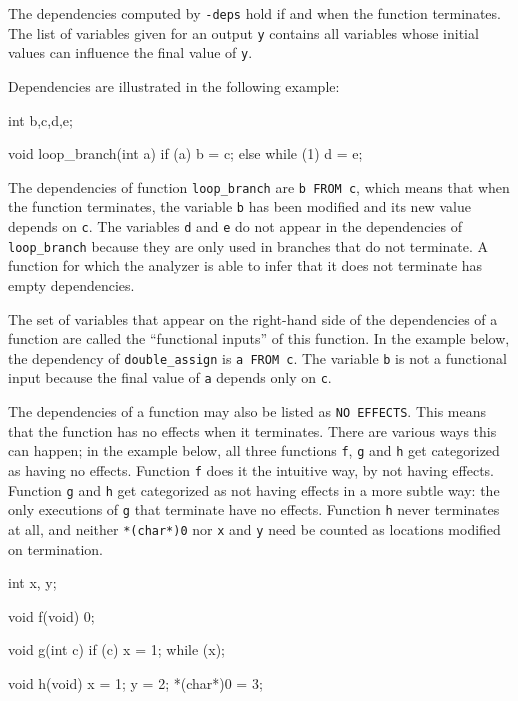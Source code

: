 \documentclass[web]{frama-c-book}
\begin{document}
The dependencies computed by \lstinline|-deps| hold if and when the function
terminates. The list of variables given for an output \lstinline|y|
contains all variables whose initial values can influence the final value
of \lstinline|y|.

Dependencies are illustrated in the following example:

\begin{listing}{1}
int b,c,d,e;

void loop_branch(int a)
{
  if (a)
    b = c;
  else
    while (1) d = e;
}
\end{listing}

The dependencies of function \lstinline|loop_branch| are
\lstinline|b FROM c|, which means that when the
function terminates, the variable \lstinline|b| has been modified
and its new value depends on \lstinline|c|. The variables \lstinline|d| and \lstinline|e|
do not appear in the dependencies of \lstinline|loop_branch| because
they are only used in branches that do not terminate. A function
for which the analyzer is able to infer that it does not terminate
has empty dependencies.

The set of variables that appear on the right-hand side of the
dependencies of a function are called the ``functional inputs''
of this function. In the example below, the dependency of
\lstinline|double_assign| is \lstinline|a FROM c|.
The variable \lstinline|b| is not a functional input because the final value
of \lstinline|a| depends only on \lstinline|c|.

The dependencies of a function may also be listed as \lstinline|NO EFFECTS|.
This means that the function has no effects when it terminates. There
are various ways this can happen; in the example below, all three functions
\lstinline|f|, \lstinline|g| and \lstinline|h| get categorized as having
no effects. Function \lstinline|f| does it the intuitive way, by not having
effects. Function \lstinline|g| and \lstinline|h| get categorized as
not having effects in a more subtle way: the only executions of \lstinline|g|
that terminate have no effects. Function \lstinline|h| never terminates at all,
and neither \lstinline|*(char*)0| nor \lstinline|x| and \lstinline|y| need
be counted as locations modified on termination.

\begin{listing}{1}
int x, y;

void f(void)
{
  0;
}

void g(int c)
{
  if (c)
  {
    x = 1;
    while (x);
  }
}

void h(void)
{
  x = 1;
  y = 2;
  *(char*)0 = 3;
}
\end{listing}
\end{document}
